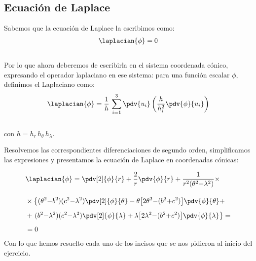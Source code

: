 \subsection{Ecuación de Laplace}

Sabemos que la ecuación de Laplace la escribimos como:
\begin{align*}
\laplacian{\phi} = 0
\end{align*}
\\
Por lo que ahora deberemos de escribirla en el sistema coordenada cónico, expresando el operador laplaciano en ese sistema: para una función escalar $\phi$, definimos el Laplaciano como:
\begin{align*}
\laplacian{\phi} = \dfrac{1}{h} \, \sum_{i=1}^{3} \pdv{u_{i}} \left( \dfrac{h}{h_{i}^{2}}  \pdv{\phi}{u_{i}} \right)
\end{align*}
\\
con $h = h_{r} \, h_{\theta} \, h_{\lambda}$.
\par

Resolvemos las correspondientes diferenciaciones de segundo orden, simplificamos las expresiones y presentamos la ecuación de Laplace en coordenadas cónicas:

\begin{align*}
&\laplacian{\phi} = \pdv[2]{\phi}{r} + \dfrac{2}{r} \pdv{\phi}{r} + \dfrac{1}{r^{2} (\theta^{2} {-} \lambda^{2})} \times \\[1em]
&\times \left\{ (\theta^{2} {-} b^{2})(c^{2} {-} \lambda^{2}) \pdv[2]{\phi}{\theta} - \theta \big[ 2 \theta^{2} {-} (b^{2} {+} c^{2}) \big] \pdv{\phi}{\theta} + \right.\\[0.5em]
&+ \left. (b^{2} {-} \lambda^{2})(c^{2} {-} \lambda^{2}) \pdv[2]{\phi}{\lambda} + \lambda \big[ 2 \lambda^{2} {-} (b^{2} {+} c^{2}) \big] \pdv{\phi}{\lambda} \right\} = \\[0.5em]
&= 0
\end{align*}
Con lo que hemos resuelto cada uno de los incisos que se nos pidieron al inicio del ejercicio.
